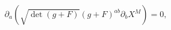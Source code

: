 \begin{equation}
\partial_a \left( \sqrt{\det(g+F)} (g+F)^{ab} \partial_b X^M\right)=0,
\end{equation}

